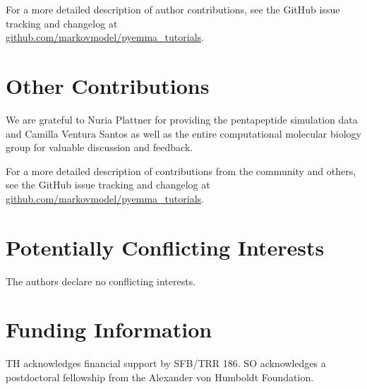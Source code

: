 \documentclass[9pt,tutorial]{livecoms}
\newcommand{\githubrepository}{\url{github.com/markovmodel/pyemma_tutorials}}
\begin{document}
For a more detailed description of author contributions, see the GitHub issue tracking and changelog at\\\githubrepository{}.

\section{Other Contributions}
%
We are grateful to Nuria Plattner for providing the pentapeptide simulation data and Camilla Ventura Santos as well as the entire computational molecular biology group for valuable discussion and feedback.

For a more detailed description of contributions from the community and others, see the GitHub issue tracking and changelog at \githubrepository{}.

\section{Potentially Conflicting Interests}
The authors declare no conflicting interests.

\section{Funding Information}
TH acknowledges financial support by SFB/TRR 186. SO acknowledges a postdoctoral fellowship from the Alexander von Humboldt Foundation.




\end{document}
